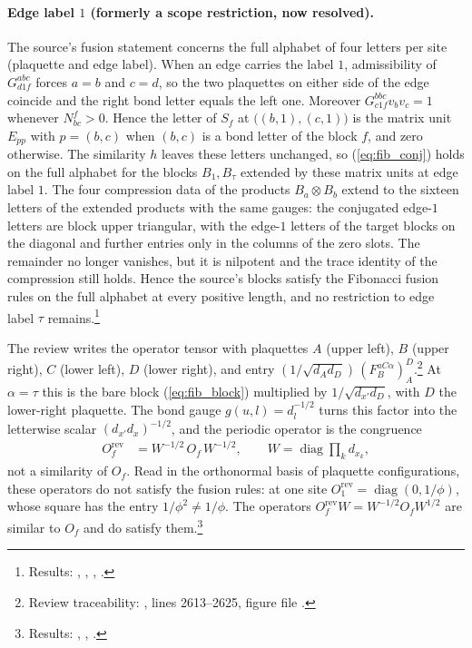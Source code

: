 \documentclass{article}
\begin{document}
\paragraph{Edge label $1$ (formerly a scope restriction, now resolved).}
The source's fusion statement concerns the full alphabet of four letters per
site (plaquette and edge label). When an edge carries the label $1$,
admissibility of $G^{abc}_{d1f}$ forces $a=b$ and $c=d$, so the two plaquettes
on either side of the edge coincide and the right bond letter equals the left
one. Moreover $G^{bbc}_{c1f}v_bv_c=1$ whenever $N_{bc}^f>0$. Hence the letter
of $S_f$ at $\bigl((b,1),(c,1)\bigr)$ is the matrix unit $E_{pp}$ with
$p=(b,c)$ when $(b,c)$ is a bond letter of the block $f$, and zero otherwise.
The similarity $h$ leaves these letters unchanged, so (\ref{eq:fib_conj})
holds on the full alphabet for the blocks $B_1,B_\tau$ extended by these
matrix units at edge label $1$. The four compression data of the products
$B_a\otimes B_b$ extend to the sixteen letters of the extended products with
the same gauges: the conjugated edge-$1$ letters are block upper triangular,
with the edge-$1$ letters of the target blocks on the diagonal and further
entries only in the columns of the zero slots. The remainder no longer
vanishes, but it is nilpotent and the trace identity of the compression still
holds. Hence the source's blocks satisfy the Fibonacci fusion rules on the
full alphabet at every positive length, and no restriction to edge label
$\tau$ remains.\footnote{Results:
    ,
    ,
    ,
    .}

The review \cite{Cirac2021Matrix} writes the operator tensor with plaquettes
$A$ (upper left), $B$ (upper right), $C$ (lower left), $D$ (lower right), and
entry $(1/\sqrt{d_Ad_D})\,(F^{aC\alpha}_B)^D_A$.\footnote{Review traceability:
    , lines 2613--2625, figure
    file .}
At $\alpha=\tau$ this is the bare block (\ref{eq:fib_block}) multiplied by
$1/\sqrt{d_{x'}d_D}$, with $D$ the lower-right plaquette. The bond gauge $g(u,l)=d_l^{-1/2}$ turns this factor
into the letterwise scalar $(d_{x'}d_x)^{-1/2}$, and the periodic operator is
the congruence
\begin{align}
    O_f^{\mathrm{rev}} & =W^{-1/2}\,O_f\,W^{-1/2},
    \qquad W=\operatorname{diag}\prod_k d_{x_k},
    \label{eq:fib_review}
\end{align}
not a similarity of $O_f$. Read in the orthonormal basis of plaquette
configurations, these operators do not satisfy the fusion rules: at one site
$O_1^{\mathrm{rev}}=\operatorname{diag}(0,1/\phi)$, whose square has the entry
$1/\phi^2\neq1/\phi$. The operators
$O_f^{\mathrm{rev}}W=W^{-1/2}O_fW^{1/2}$ are similar to $O_f$
and do satisfy them.\footnote{Results:
    ,
    ,
    .}
\end{document}

